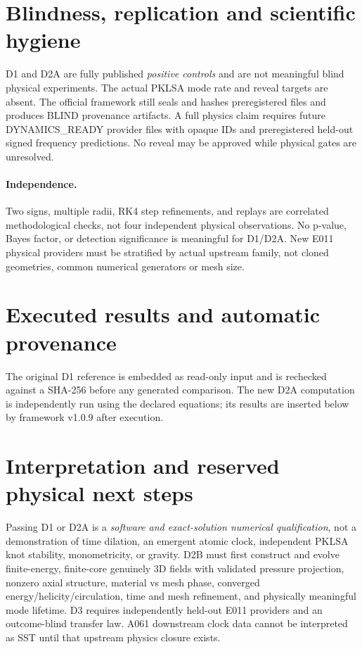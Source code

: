\documentclass[10pt,a4paper]{article}
\begin{document}
\section{Blindness, replication and scientific hygiene}
D1 and D2A are fully published \emph{positive controls} and are not meaningful
blind physical experiments. The actual PKLSA mode rate and reveal targets are
absent. The official framework still seals and hashes preregistered files and
produces BLIND provenance artifacts. A full physics claim requires future
DYNAMICS\_READY provider files with opaque IDs and preregistered held-out
signed frequency predictions. No reveal may be approved while physical gates
are unresolved.
\paragraph{Independence.}
Two signs, multiple radii, RK4 step refinements, and replays are correlated
methodological checks, not four independent physical observations. No p-value,
Bayes factor, or detection significance is meaningful for D1/D2A. New E011
physical providers must be stratified by actual upstream family, not cloned
geometries, common numerical generators or mesh size.
\section{Executed results and automatic provenance}
The original D1 reference is embedded as read-only input and is rechecked
against a SHA-256 before any generated comparison. The new D2A computation
is independently run using the declared equations; its results are inserted
below by framework v1.0.9 after execution.\par
{}
\section{Interpretation and reserved physical next steps}
Passing D1 or D2A is a \emph{software and exact-solution numerical qualification},
not a demonstration of time dilation, an emergent atomic clock, independent
PKLSA knot stability, monometricity, or gravity. D2B must first construct
and evolve finite-energy, finite-core genuinely 3D fields with validated
pressure projection, nonzero axial structure, material vs mesh phase,
converged energy/helicity/circulation, time and mesh refinement, and physically
meaningful mode lifetime. D3 requires independently held-out E011 providers
and an outcome-blind transfer law. A061 downstream clock data cannot be
interpreted as SST until that upstream physics closure exists.
\end{document}
